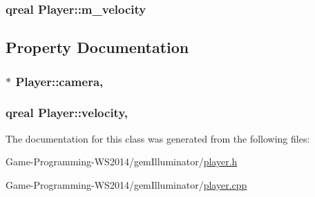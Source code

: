 \subsubsection[{m\+\_\+velocity}]{\setlength{\rightskip}{0pt plus 5cm}qreal Player\+::m\+\_\+velocity\hspace{0.3cm}{\ttfamily [protected]}}\label{class_player_a962e97e5fd3fe1c2db4e7e2066dbe61c}


\subsection{Property Documentation}
\hypertarget{class_player_a4e1ae30bdaec837b94451416a523d5cb}{}
\subsubsection[{camera}]{ $\ast$ Player\+::camera\hspace{0.3cm}{\ttfamily [read]}, {\ttfamily [write]}}\label{class_player_a4e1ae30bdaec837b94451416a523d5cb}
\hypertarget{class_player_a53141a3791c456938945973cc78a2ea7}{}
\subsubsection[{velocity}]{\setlength{\rightskip}{0pt plus 5cm}qreal Player\+::velocity\hspace{0.3cm}{\ttfamily [read]}, {\ttfamily [write]}}\label{class_player_a53141a3791c456938945973cc78a2ea7}


The documentation for this class was generated from the following files\+:\begin{DoxyCompactItemize}
\item 
Game-\/\+Programming-\/\+W\+S2014/gem\+Illuminator/\hyperlink{player_8h}{player.\+h}\item 
Game-\/\+Programming-\/\+W\+S2014/gem\+Illuminator/\hyperlink{player_8cpp}{player.\+cpp}\end{DoxyCompactItemize}

